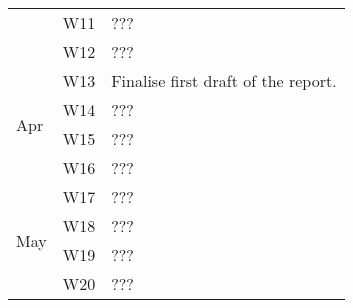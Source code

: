 \documentclass{article}
\begin{document}
\begin{table}[]
\begin{tabular}{lll}
                     & W11  & ??? \\
                     & W12  & ??? \\ \hline
\multirow{4}{*}{Apr} & W13  & Finalise first draft of the report. \\
                     & W14  & ??? \\
                     & W15  & ??? \\
                     & W16  & ??? \\ \hline
\multirow{4}{*}{May} & W17  & ??? \\
                     & W18  & ??? \\
                     & W19  & ??? \\
                     & W20  & ???
\end{tabular}
\end{table}

\newpage


\end{document}
